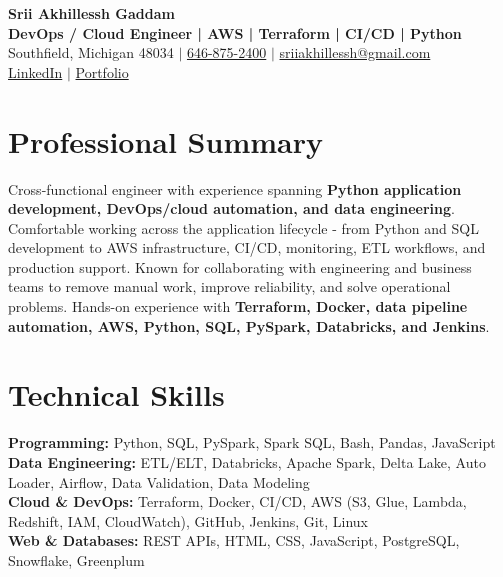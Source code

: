 \documentclass[letterpaper,10pt]{article}
\begin{document}
\fontsize{9.35pt}{10.45pt}\selectfont

\begin{center}
    {\LARGE \textbf{Srii Akhillessh Gaddam}} \\[-1pt]
    \textbf{DevOps / Cloud Engineer | AWS | Terraform | CI/CD | Python} \\[2pt]
    Southfield, Michigan 48034 $|$
    \href{tel:6468752400}{646-875-2400} $|$
    \href{mailto:sriiakhillessh@gmail.com}{sriiakhillessh@gmail.com} \\[1pt]
    \href{https://www.linkedin.com/in/srii-akhiilessh-gaddam-b48668191/}{LinkedIn} $|$
    \href{https://sriiakhillesshg.github.io/portfolio/}{Portfolio}
\end{center}
\vspace{-8pt}

\section{Professional Summary}
\small{Cross-functional engineer with experience spanning \textbf{Python application development, DevOps/cloud automation, and data engineering}. Comfortable working across the application lifecycle - from Python and SQL development to AWS infrastructure, CI/CD, monitoring, ETL workflows, and production support. Known for collaborating with engineering and business teams to remove manual work, improve reliability, and solve operational problems. Hands-on experience with \textbf{Terraform, Docker, data pipeline automation, AWS, Python, SQL, PySpark, Databricks, and Jenkins}.}

\section{Technical Skills}
\small{
\textbf{Programming:} Python, SQL, PySpark, Spark SQL, Bash, Pandas, JavaScript \\
\textbf{Data Engineering:} ETL/ELT, Databricks, Apache Spark, Delta Lake, Auto Loader, Airflow, Data Validation, Data Modeling \\
\textbf{Cloud \& DevOps:} Terraform, Docker, CI/CD, AWS (S3, Glue, Lambda, Redshift, IAM, CloudWatch), GitHub, Jenkins, Git, Linux \\
\textbf{Web \& Databases:} REST APIs, HTML, CSS, JavaScript, PostgreSQL, Snowflake, Greenplum
}
\end{document}
